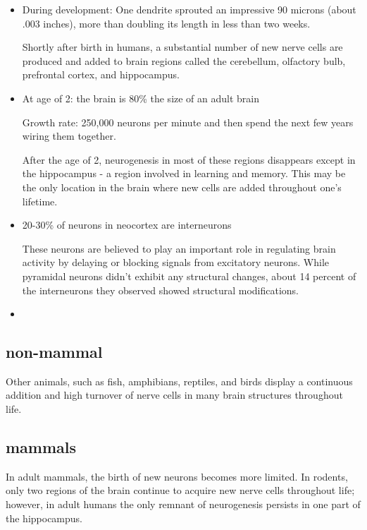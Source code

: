 \begin{itemize}
  \item  During development:  One dendrite sprouted an impressive 90 microns
  (about .003 inches), more than doubling its length in less than two weeks.

Shortly after birth in humans, a substantial number of new nerve cells are
produced and added to brain regions called the cerebellum, olfactory bulb,
prefrontal cortex, and hippocampus. 
  
  \item At age of 2: the brain is 80\% the size of an adult brain

Growth rate: 250,000 neurons per minute and then spend the next few years wiring
them together.

After the age of 2, neurogenesis in most of these regions disappears except in
the hippocampus - a region involved in learning and memory. This may be the only
location in the brain where new cells are added throughout one's lifetime.
  
  \item 20-30\% of neurons in neocortex are interneurons

These neurons are believed to play an important role in regulating brain
activity by delaying or blocking signals from excitatory neurons. While
pyramidal neurons didn't exhibit any structural changes, about 14 percent of the
interneurons they observed showed structural modifications.

  \item 
\end{itemize}

\subsection{non-mammal}

Other animals, such as fish, amphibians, reptiles, and birds display a
continuous addition and high turnover of nerve cells in many brain structures
throughout life.

\subsection{mammals}

In adult mammals, the birth of new neurons becomes more limited.
In rodents, only two regions of the brain continue to acquire new nerve cells
throughout life; however, in adult humans the only remnant of neurogenesis
persists in one part of the hippocampus.


